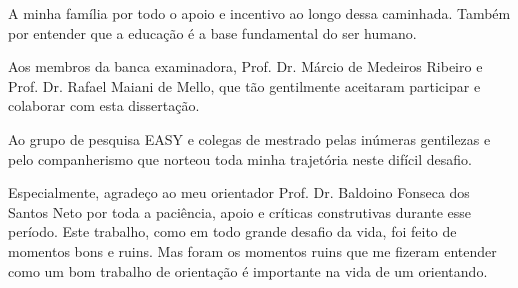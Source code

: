 A minha família por todo o apoio e incentivo ao longo dessa caminhada. Também por entender que a educação é a base fundamental do ser humano.

Aos membros da banca examinadora, Prof. Dr. Márcio de Medeiros Ribeiro e
Prof. Dr. Rafael Maiani de Mello, que tão gentilmente aceitaram participar e
colaborar com esta dissertação. 

Ao grupo de pesquisa EASY e colegas de mestrado pelas inúmeras gentilezas e pelo companherismo que norteou toda minha trajetória neste difícil desafio. 

Especialmente, agradeço ao meu orientador Prof. Dr. Baldoino Fonseca dos Santos Neto por toda a paciência, apoio e críticas construtivas durante esse período. Este trabalho, como em todo grande desafio da vida, foi feito de momentos bons e ruins. Mas foram os momentos ruins que me fizeram entender como um bom trabalho de orientação é importante na vida de um orientando.



